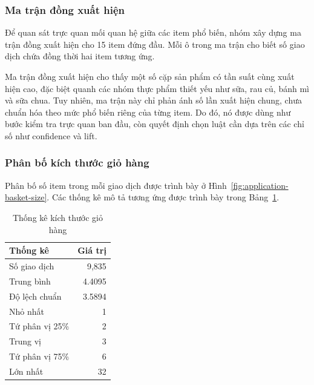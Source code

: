 \subsubsection{Ma trận đồng xuất hiện}

Để quan sát trực quan mối quan hệ giữa các item phổ biến, nhóm xây dựng ma trận đồng xuất hiện cho 15 item đứng đầu. Mỗi ô trong ma trận cho biết số giao dịch chứa đồng thời hai item tương ứng.


Ma trận đồng xuất hiện cho thấy một số cặp sản phẩm có tần suất cùng xuất hiện cao, đặc biệt quanh các nhóm thực phẩm thiết yếu như sữa, rau củ, bánh mì và sữa chua. Tuy nhiên, ma trận này chỉ phản ánh số lần xuất hiện chung, chưa chuẩn hóa theo mức phổ biến riêng của từng item. Do đó, nó được dùng như bước kiểm tra trực quan ban đầu, còn quyết định chọn luật cần dựa trên các chỉ số như confidence và lift.

\subsubsection{Phân bố kích thước giỏ hàng}

Phân bố số item trong mỗi giao dịch được trình bày ở Hình~\ref{fig:application-basket-size}. Các thống kê mô tả tương ứng được trình bày trong Bảng~\ref{tab:application-basket-size}.

\begin{table}[H]
\centering
\caption{Thống kê kích thước giỏ hàng}
\label{tab:application-basket-size}
\begin{tabular}{lr}
\toprule
Thống kê & Giá trị \\
\midrule
Số giao dịch & 9,835 \\
Trung bình & 4.4095 \\
Độ lệch chuẩn & 3.5894 \\
Nhỏ nhất & 1 \\
Tứ phân vị 25\% & 2 \\
Trung vị & 3 \\
Tứ phân vị 75\% & 6 \\
Lớn nhất & 32 \\
\bottomrule
\end{tabular}
\end{table}



